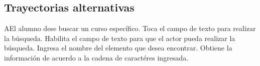 	\subsection{Trayectorias alternativas}

\begin{UCtrayectoriaA}{A}{El alumno dese buscar un curso específico.}
	\UCpaso[\UCactor] Toca el campo de texto para realizar la búsqueda.
	\UCpaso[\UCsist] Habilita el campo de texto para que el actor pueda realizar la búsqueda.
	\UCpaso[\UCactor] Ingresa el nombre del elemento que desea encontrar.
	\UCpaso[\UCsist] Obtiene la información de acuerdo a la cadena de caractéres ingresada. 
\end{UCtrayectoriaA}
